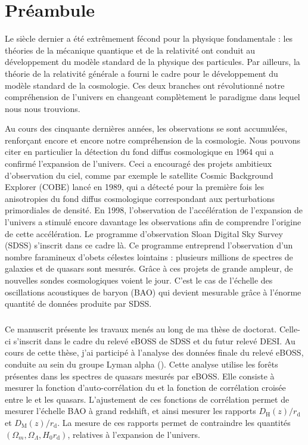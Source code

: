 \chapter*{Préambule}
\thispagestyle{plain}
Le  siècle dernier a été extrêmement fécond pour la physique fondamentale : les théories de la mécanique quantique et de la relativité ont conduit au développement du modèle standard de la physique des particules. Par ailleurs, la théorie de la relativité générale a fourni le cadre pour le développement du modèle standard de la cosmologie. Ces deux branches ont révolutionné notre compréhension de l'univers en changeant complètement le paradigme dans lequel nous nous trouvions.

Au cours des cinquante dernières années, les observations se sont accumulées, renforçant encore et encore notre compréhension de la cosmologie. Nous pouvons citer en particulier la détection du fond diffus cosmologique en 1964 qui a confirmé l'expansion de l'univers. Ceci a encouragé des projets ambitieux d'observation du ciel, comme par exemple le satellite Cosmic Background Explorer (COBE) lancé en 1989, qui a détecté pour la première fois les anisotropies du fond diffus cosmologique correspondant aux perturbations primordiales de densité.
En 1998, l'observation de l'accélération de l'expansion de l'univers a stimulé encore davantage les observations afin de comprendre l'origine de cette accélération. Le programme d'observation Sloan Digital Sky Survey (SDSS) s'inscrit dans ce cadre là. Ce programme entreprend l'observation d'un nombre faramineux d'obets célestes lointains : plusieurs millions de spectres de galaxies et de quasars sont mesurés.
Grâce à ces projets de grande ampleur, de nouvelles sondes cosmologiques voient le jour. C'est le cas de l'échelle des oscillations acoustiques de baryon (BAO) qui devient mesurable grâce à l'énorme quantité de données produite par SDSS.

\paragraph{}
Ce manuscrit présente les travaux menés au long de ma thèse de doctorat.
Celle-ci s'inscrit dans le cadre du relevé eBOSS de SDSS et du futur relevé DESI.
Au cours de cette thèse, j'ai participé à l'analyse des données finale du relevé eBOSS, conduite au sein du groupe Lyman alpha (\lya{}).
Cette analyse utilise les forêts \lya{} présentes dans les spectres de quasars mesurés par eBOSS.
Elle consiste à mesurer la fonction d'auto-corrélation du \lya{} et la fonction de corrélation croisée entre le \lya{} et les quasars.
L'ajustement de ces fonctions de corrélation permet de mesurer l'échelle BAO à grand redshift, et ainsi mesurer les rapports $D_{\mathrm{H}}(z) / r_{\mathrm{d}}$ et $D_{\mathrm{M}}(z) / r_{\mathrm{d}}$. La mesure de ces rapports permet de contraindre les quantités $(\Omega_{m} , \Omega_{\Lambda} , H_0 r_{\mathrm{d}})$, relatives à l'expansion de l'univers.

